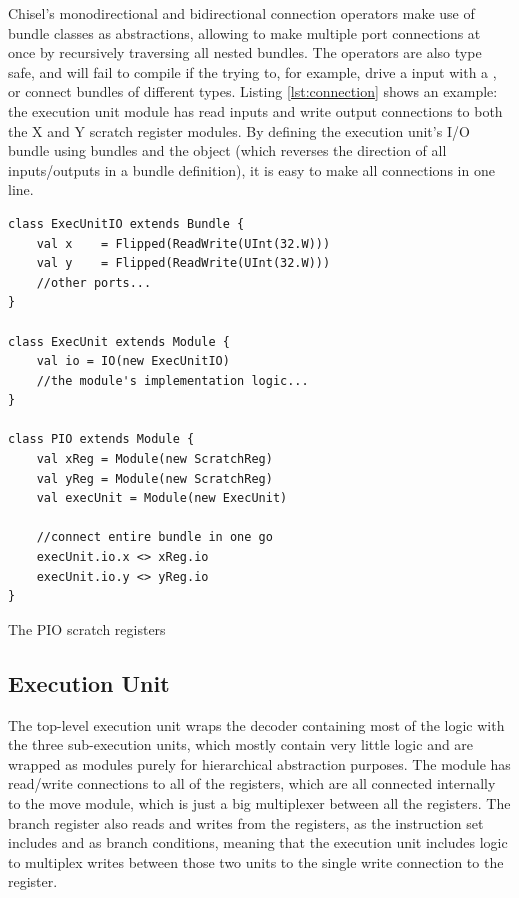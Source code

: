 Chisel's monodirectional \txt{:=} and bidirectional \txt{<>} connection operators make use of bundle classes as abstractions, allowing to make multiple port connections at once by recursively traversing all nested bundles. The operators are also type safe, and will fail to compile if the trying to, for example, drive a  input with a , or connect bundles of different types. Listing \ref{lst:connection} shows an example: the execution unit module has read inputs and write output connections to both the X and Y scratch register modules. By defining the execution unit's I/O bundle using  bundles and the  object (which reverses the direction of all inputs/outputs in a bundle definition), it is easy to make all connections in one line.

\begin{listing}[h!]
    \vspace{0.5cm}
    \begin{verbatim}
class ExecUnitIO extends Bundle {
    val x    = Flipped(ReadWrite(UInt(32.W)))
    val y    = Flipped(ReadWrite(UInt(32.W)))
    //other ports...          
}

class ExecUnit extends Module {
    val io = IO(new ExecUnitIO)
    //the module's implementation logic...
}

class PIO extends Module {
    val xReg = Module(new ScratchReg)
    val yReg = Module(new ScratchReg)
    val execUnit = Module(new ExecUnit)

    //connect entire bundle in one go
    execUnit.io.x <> xReg.io
    execUnit.io.y <> yReg.io
}
    \end{verbatim}
    \caption{The PIO scratch registers}
    \label{lst:connection}
\end{listing}

\subsection{Execution Unit}

The top-level execution unit wraps the decoder containing most of the logic with the three sub-execution units, which mostly contain very little logic and are wrapped as modules purely for hierarchical abstraction purposes. The module has read/write connections to all of the registers, which are all connected internally to the move module, which is just a big multiplexer between all the registers. The branch register also reads and writes from the registers, as the instruction set includes  and  as branch conditions, meaning that the execution unit includes logic to multiplex writes between those two units to the single write connection to the register.

